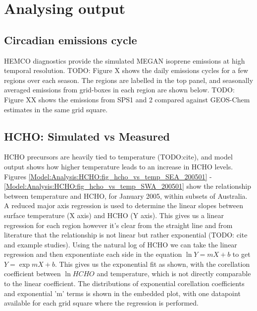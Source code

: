 \section{Analysing output}
\label{Model:Analysis}
  
    
    
  \subsection{Circadian emissions cycle}
    HEMCO diagnostics provide the simulated MEGAN isoprene emissions at high temporal resolution.
    TODO: Figure X shows the daily emissions cycles for a few regions over each season. 
    The regions are labelled in the top panel, and seasonally averaged emissions from grid-boxes in each region are shown below.
    TODO: Figure XX shows the emissions from SPS1 and 2 compared against GEOS-Chem estimates in the same grid square.
    
  \subsection{HCHO: Simulated vs Measured}
  \label{Model:Analysis:HCHO}
    
    HCHO precursors are heavily tied to temperature (TODO:cite), and model output shows how higher temperature leads to an increase in HCHO levels.
    Figures \ref{Model:Analysis:HCHO:fig_hcho_vs_temp_SEA_200501} - \ref{Model:Analysis:HCHO:fig_hcho_vs_temp_SWA_200501} show the relationship between temperature and HCHO, for January 2005, within subsets of Australia.
    A reduced major axis regression is used to determine the linear slopes between surface temperature (X axis) and HCHO (Y axis).
    This gives us a linear regression for each region however it's clear from the straight line and from literature that the relationship is not linear but rather exponential (TODO: cite and example studies).
    Using the natural log of HCHO we can take the linear regression and then exponentiate each side in the equation $\ln{Y} = m{X}+b$ to get ${Y} = \exp{m{X}+b}$. 
    This gives us the exponential fit as shown, with the corellation coefficient between $\ln{HCHO}$ and temperature, which is not directly comparable to the linear coefficient.
    The distributions of exponential corellation coefficients and exponential 'm' terms is shown in the embedded plot, with one datapoint available for each grid square where the regression is performed.
    
